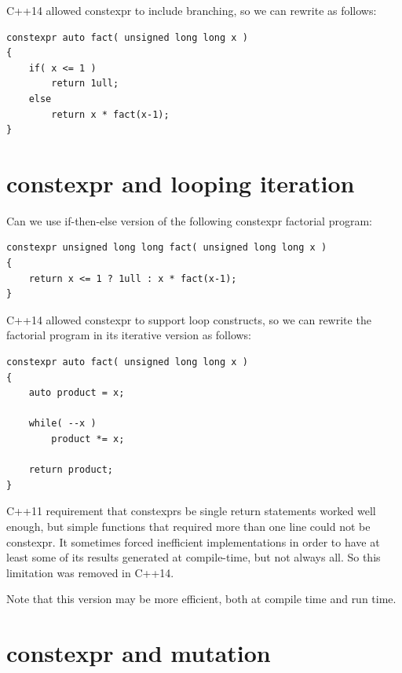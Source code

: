 \begin{Answer}[ref=ex018]
C++14 allowed constexpr to include branching, so we can rewrite as follows:
\begin{lstlisting}
constexpr auto fact( unsigned long long x ) 
{
    if( x <= 1 )
        return 1ull;
    else
        return x * fact(x-1);
}
\end{lstlisting}
\end{Answer}



\section{constexpr and looping iteration}

\begin{Exercise}[title={constexpr and looping iteration}, difficulty=2, label=ex019]
Can we use if-then-else version of the following constexpr factorial program:
\begin{lstlisting}
constexpr unsigned long long fact( unsigned long long x ) 
{
    return x <= 1 ? 1ull : x * fact(x-1);
}
\end{lstlisting}
\end{Exercise}


\begin{Answer}[ref=ex019]
C++14 allowed constexpr to support loop constructs, so we can rewrite the factorial program in its iterative version as follows:
\begin{lstlisting}
constexpr auto fact( unsigned long long x ) 
{
    auto product = x;
    
    while( --x )
        product *= x;
        
    return product;
}
\end{lstlisting}
C++11 requirement that constexprs be single return statements worked well enough, but simple functions that required more than one line could not be constexpr. It sometimes forced inefficient implementations in order to have at least some of its results generated at compile-time, but not always all. So this limitation was removed in C++14.

Note that this version may be more efficient, both at compile time and run time.
\end{Answer}



\section{constexpr and mutation}

